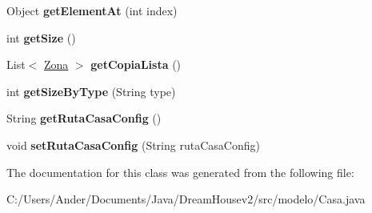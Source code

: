 \begin{DoxyCompactItemize}
\item 
\mbox{\label{classmodelo_1_1_casa_a82e53172ee38914af2b3edd24d65004f}} 
Object {\bfseries get\+Element\+At} (int index)
\item 
\mbox{\label{classmodelo_1_1_casa_a81cbd6dd883f5dc86616dc292d01efb7}} 
int {\bfseries get\+Size} ()
\item 
\mbox{\label{classmodelo_1_1_casa_ae424bde8585ebf744728e2f6a79d9241}} 
List$<$ \mbox{\hyperlink{classmodelo_1_1_zona}{Zona}} $>$ {\bfseries get\+Copia\+Lista} ()
\item 
\mbox{\label{classmodelo_1_1_casa_ae81948c050f1cc75212453a626f9e48f}} 
int {\bfseries get\+Size\+By\+Type} (String type)
\item 
\mbox{\label{classmodelo_1_1_casa_a50685b459f8c975d5305478b18526914}} 
String {\bfseries get\+Ruta\+Casa\+Config} ()
\item 
\mbox{\label{classmodelo_1_1_casa_a453497c80f101aaf649b29c2dc301a6f}} 
void {\bfseries set\+Ruta\+Casa\+Config} (String ruta\+Casa\+Config)
\end{DoxyCompactItemize}


The documentation for this class was generated from the following file\+:\begin{DoxyCompactItemize}
\item 
C\+:/\+Users/\+Ander/\+Documents/\+Java/\+Dream\+Housev2/src/modelo/Casa.\+java\end{DoxyCompactItemize}
